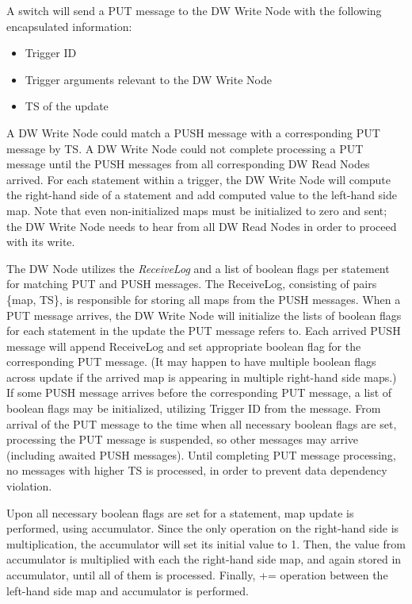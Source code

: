 \documentclass{sig-semester}
\begin{document}
A switch will send a PUT message to the DW Write Node with the following encapsulated information:
\begin{itemize}
 \item Trigger ID
 \item Trigger arguments relevant to the DW Write Node
 \item TS of the update
\end{itemize}

A DW Write Node could match a PUSH message with a corresponding PUT message by TS. A DW Write Node could not complete processing a PUT message until the PUSH messages from all corresponding DW Read Nodes arrived. For each statement within a trigger, the DW Write Node will compute the right-hand side of a statement and add computed value to the left-hand side map. Note that even non-initialized maps must be initialized to zero and sent; the DW Write Node needs to hear from all DW Read Nodes in order to proceed with its write.

The DW Node utilizes the \textit{ReceiveLog} and a list of boolean flags per statement for matching PUT and PUSH messages. The ReceiveLog, consisting of pairs \{map, TS\}, is responsible for storing all maps from the PUSH messages. When a PUT message arrives, the DW Write Node will initialize the lists of boolean flags for each statement in the update the PUT message refers to. Each arrived PUSH message will append ReceiveLog and set appropriate boolean flag for the corresponding PUT message. (It may happen to have multiple boolean flags across update if the arrived map is appearing in multiple right-hand side maps.) If some PUSH message arrives before the corresponding PUT message, a list of boolean flags may be initialized, utilizing Trigger ID from the message. From arrival of the PUT message to the time when all necessary boolean flags are set, processing the PUT message is suspended, so other messages may arrive (including awaited PUSH messages). Until completing PUT message processing, no messages with higher TS is processed, in order to prevent data dependency violation.

Upon all necessary boolean flags are set for a statement, map update is performed, using accumulator. Since the only operation on the right-hand side is multiplication, the accumulator will set its initial value to 1. Then, the value from accumulator is multiplied with each the right-hand side map, and again stored in accumulator, until all of them is processed. Finally, += operation between the left-hand side map and accumulator is performed.
\end{document}
